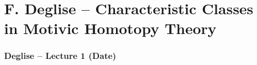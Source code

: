 \part{F. Deglise -- Characteristic Classes in Motivic Homotopy Theory}
\section{Deglise -- Lecture 1 (Date)}